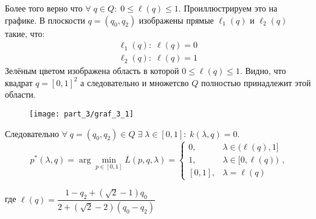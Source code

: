 Более того верно что 
$\forall \; q \in Q: \; 0 \leqslant \ell(q) \leqslant 1$. 
Проиллюстрируем это на графике. В плоскости $q=(q_0,q_2)$ изображены 
прямые $\ell_1(q)$ и $\ell_2(q)$ такие, что:
\begin{gather*}
	\ell_1(q): \; \ell(q)=0 
	\\
	\ell_2(q): \; \ell(q)=1
\end{gather*}
Зелёным цветом изображена область в которой
$0 \leqslant \ell(q) \leqslant 1$.
Видно, что квадрат $q = [0,1]^2$ а следовательно и
множетсво $Q$ полностью принадлежит этой области.
\begin{figure}[H]
	\centering
  	\texttt{[image: part\_3/graf\_3\_1]}
  	\caption{}
\end{figure}

Следовательно $\forall \; q=(q_0, q_2) \in Q \;
\exists \; \lambda \in [0,1]: \; k(\lambda,q)=0$.
\begin{equation}
	\label{eq:p*}
	p^*(\lambda,q)=
	\arg \min \limits_{p \in [0, 1]} \overline{L}(p,q,\lambda)=
	\begin{cases}
		0, & \lambda \in \big(\ell (q), 1\big] \\
		1, & \lambda \in \big[0, \ell(q) \big) \\
		[0,1], & \lambda=\ell(q)
	\end{cases},
\end{equation}

где $\ell(q)=\dfrac{1 - q_2 + (\sqrt{2} - 1)q_0}{2+(\sqrt{2}-2)(q_0-q_2)}$